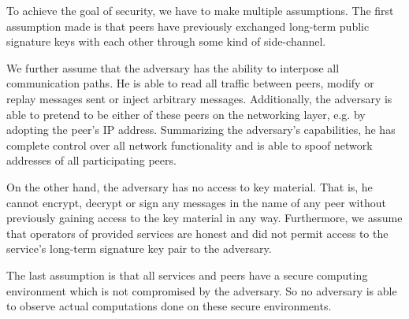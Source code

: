 To achieve the goal of security, we have to make multiple assumptions.
The first assumption made is that peers have previously exchanged long-term public signature keys with each other through some kind of side-channel.

We further assume that the adversary has the ability to interpose all communication paths.
He is able to read all traffic between peers, modify or replay messages sent or inject arbitrary messages.
Additionally, the adversary is able to pretend to be either of these peers on the networking layer, e.g. by adopting the peer's IP address.
Summarizing the adversary's capabilities, he has complete control over all network functionality and is able to spoof network addresses of all participating peers.

On the other hand, the adversary has no access to key material.
That is, he cannot encrypt, decrypt or sign any messages in the name of any peer without previously gaining access to the key material in any way.
Furthermore, we assume that operators of provided services are honest and did not permit access to the service's long-term signature key pair to the adversary.

The last assumption is that all services and peers have a secure computing environment which is not compromised by the adversary.
So no adversary is able to observe actual computations done on these secure environments.

